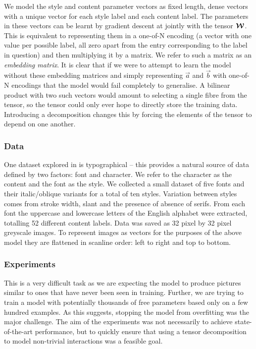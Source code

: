 {We model the style and content parameter vectors as fixed length, dense vectors with a unique
vector for each style label and each content label. The parameters in these vectors can be
learnt by gradient descent at jointly with the tensor \(\bm{\mathcal{W}}\). This is equivalent
to representing them in a one-of-N encoding (a vector with one value per possible label, all
zero apart from the entry corresponding to the label in question) and then multiplying it by
a matrix. We refer to such a matrix as an \textit{embedding matrix}. It is clear that if we
were to attempt to learn the model without these embedding matrices and simply representing
\(\vec{a}\) and \(\vec{b}\) with one-of-N encodings that the model would fail completely to
generalise. A bilinear product with two such vectors would amount to selecting a single fibre
from the tensor, so the tensor could only ever hope to directly store the training data.
Introducing a decomposition changes this by forcing the elements of the tensor to depend on
one another.


\subsubsection{Data}
One dataset explored in \autocite{Tenenbaum2000} is typographical -- this provides a natural
source of data defined by two factors: font and character. We refer to the character as the
content and the font as the style. We collected a small dataset of five fonts and their
italic/oblique variants for a total of ten styles. Variation between styles comes from stroke
width, slant and the presence of absence of serifs. From each font the uppercase and lowercase
letters of the English alphabet were extracted, totalling 52 different content labels. Data was
saved as 32 pixel by 32 pixel greyscale images. To represent images as vectors for the purposes
of the above model they are flattened in scanline order: left to right and top to bottom.

\subsubsection{Experiments}
This is a very difficult task as we are expecting the model to produce pictures similar to ones
that have never been seen in training. Further, we are trying to train a model with potentially
thousands of free parameters based only on a few hundred examples. As this suggests, stopping
the model from overfitting was the major challenge. The aim of the experiments was not
necessarily to achieve state-of-the-art performance, but to quickly ensure that using a tensor
decomposition to model non-trivial interactions was a feasible goal.

}
